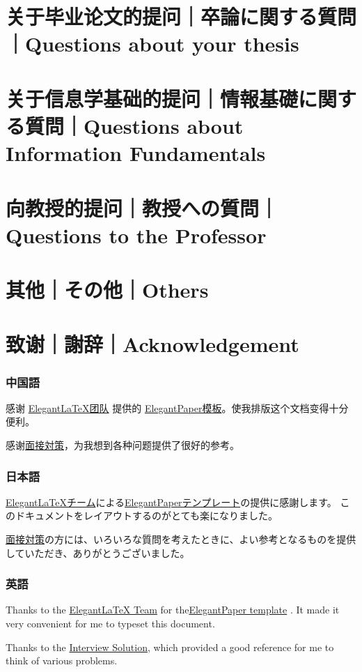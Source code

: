 \documentclass[lang=cn,11pt,a4paper]{elegantpaper}
\begin{document}
\section{关于毕业论文的提问｜卒論に関する質問｜Questions about your thesis}

\section{关于信息学基础的提问｜情報基礎に関する質問｜Questions about Information Fundamentals}

\section{向教授的提问｜教授への質問｜Questions to the Professor}

\section{其他｜その他｜Others}

\section{致谢｜謝辞｜Acknowledgement}
\subsubsection{中国語}
感谢  \href{https://elegantlatex.org/}{ElegantLaTeX团队} 提供的 \href{https://github.com/ElegantLaTeX/ElegantPaper}{ElegantPaper模板}。使我排版这个文档变得十分便利。

感谢\href{https://hatodove22.notion.site/16f0eba93f3c4153bd1f770892aaf6b1}{面接対策}，为我想到各种问题提供了很好的参考。
\subsubsection{日本語}
\href{https://elegantlatex.org/}{ElegantLaTeXチーム}による\href{https://github.com/ElegantLaTeX/ElegantPaper}{ElegantPaperテンプレート}の提供に感謝します。 このドキュメントをレイアウトするのがとても楽になりました。

\href{https://hatodove22.notion.site/16f0eba93f3c4153bd1f770892aaf6b1}{面接対策}の方には、いろいろな質問を考えたときに、よい参考となるものを提供していただき、ありがとうございました。
\subsubsection{英語}
Thanks to the \href{https://elegantlatex.org/}{ElegantLaTeX Team}  for the\href{https://github.com/ElegantLaTeX/ElegantPaper}{ElegantPaper template} . It made it very convenient for me to typeset this document.

Thanks to the \href{https://hatodove22.notion.site/16f0eba93f3c4153bd1f770892aaf6b1}{Interview Solution}, which provided a good reference for me to think of various problems.


\nocite{*}

\end{document}
